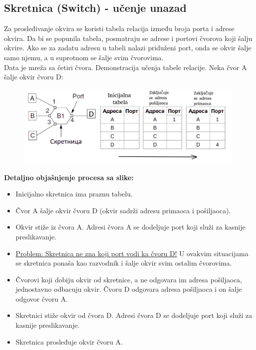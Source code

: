 \documentclass[a4paper]{article}
\begin{document}
    \subsection{Skretnica (Switch) - učenje unazad}
        Za prosleđivanje okvira se koristi tabela relacija između
        broja porta i adrese okvira. Da bi se popunila tabela, posmatraju se adrese i portovi
        čvorova koji šalju okvire. Ako se za zadatu adresu u tabeli nalazi priduženi port, onda
        se okvir šalje samo njemu, a u suprotnom se šalje svim čvorovima.\\
        \indent Data je mreža sa četiri čvora. Demonstracija učenja tabele relacije. Neka
        čvor A šalje okvir čvoru D:
        \begin{figure}[H]
            \begin{center}
                \includegraphics[width=120mm,height=40mm]{Slike/skretnica_ucenje.png}
            \end{center}
        \end{figure}

        \noindent \textbf{Detaljno objašnjenje procesa sa slike:} 
        \begin{itemize}
            \item Inicijalno skretnica ima praznu tabelu.
            \item Čvor A šalje okvir čvoru D (okvir sadrži adresu primaoca i pošiljaoca).
            \item Okvir stiže iz čvora A. Adresi čvora A se dodeljuje port koji služi
                  za kasnije preslikavanje.
            \item \underline{Problem: Skretnica ne zna koji port vodi ka čvoru D!}
                  U ovakvim situacijama se skretnica ponaša kao razvodnik i šalje okvir svim ostalim
                  čvorovima. 
            \item Čvorovi koji dobiju okvir od skretnice, a ne odgovara im adresa pošiljaoca,
                  jednostavno odbacuju okvir. Čvoru D odgovara adresa pošiljaoca i on šalje
                  odgovor čvoru A. 
            \item Skretnici stiže okvir od čvora D. Adresi čvora D se dodeljuje port koji služi
                  za kasnije preslikavanje. 
            \item Skretnica prosleđuje okvir čvoru A.
        \end{itemize}
\end{document}
